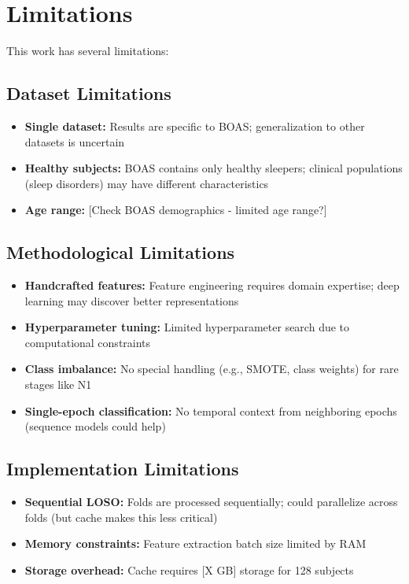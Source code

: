 \section{Limitations}
\label{sec:limitations}

This work has several limitations:

\subsection{Dataset Limitations}
\label{subsec:dataset_limitations}

\begin{itemize}
    \item \textbf{Single dataset:} Results are specific to BOAS; generalization to other datasets is uncertain
    \item \textbf{Healthy subjects:} BOAS contains only healthy sleepers; clinical populations (sleep disorders) may have different characteristics
    \item \textbf{Age range:} [Check BOAS demographics - limited age range?]
\end{itemize}

\subsection{Methodological Limitations}
\label{subsec:method_limitations}

\begin{itemize}
    \item \textbf{Handcrafted features:} Feature engineering requires domain expertise; deep learning may discover better representations
    \item \textbf{Hyperparameter tuning:} Limited hyperparameter search due to computational constraints
    \item \textbf{Class imbalance:} No special handling (e.g., SMOTE, class weights) for rare stages like N1
    \item \textbf{Single-epoch classification:} No temporal context from neighboring epochs (sequence models could help)
\end{itemize}

\subsection{Implementation Limitations}
\label{subsec:impl_limitations}

\begin{itemize}
    \item \textbf{Sequential LOSO:} Folds are processed sequentially; could parallelize across folds (but cache makes this less critical)
    \item \textbf{Memory constraints:} Feature extraction batch size limited by RAM
    \item \textbf{Storage overhead:} Cache requires [X GB] storage for 128 subjects
\end{itemize}

